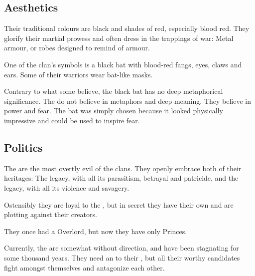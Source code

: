 \subsection{Aesthetics}
Their traditional colours are black and shades of red, especially blood red. They glorify their martial prowess and often dress in the trappings of war: Metal armour, or robes designed to remind of armour. 

One of the clan's symbols is a black bat with blood-red fangs, eyes, claws and ears. Some of their warriors wear bat-like masks. 

Contrary to what some believe, the black bat has no deep metaphorical significance. 
The \Mystraacht{} do not believe in metaphors and deep meaning. 
They believe in power and fear. 
The bat was simply chosen because it looked physically impressive and could be used to inspire fear.








\subsection{Politics}
The \Mystraacht{} are the most overtly evil of the \resphan{} clans. They openly embrace both of their heritages: The \bane{} legacy, with all its parasitism, betrayal and patricide, and the \chaotic{} legacy, with all its violence and savagery. 

Ostensibly they are loyal to the \banes, but in secret they have their own \matrixx{} and are plotting against their creators. 

They once had a Overlord, but now they have only Princes.

Currently, the \Mystraacht{} are somewhat without direction, and have been stagnating for some thousand years. They need an \apex{} to their \matrixx, but all their worthy candidates fight amongst themselves and antagonize each other. 







